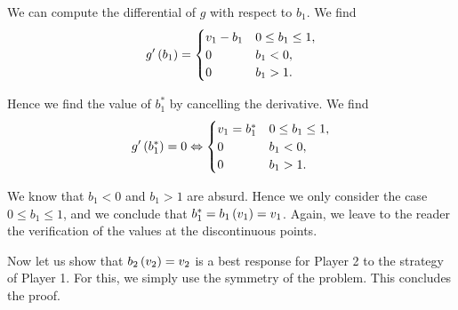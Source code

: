 We can compute the differential of $g$ with respect to $b_1$. We find
\begin{equation*}
    g' \left(b_1\right)
    =
    \begin{cases}
       v_1 - b_1  & 0 \leq b_1 \leq 1, \\
       0 & b_1 < 0, \\
       0 & b_1 > 1. \\
     \end{cases}
\end{equation*}

Hence we find the value of $b_1^{*}$ by cancelling the derivative. We find
\begin{equation*}
    g' \left(b_1^{*}\right) = 0
    \Leftrightarrow
    \begin{cases}
       v_1 = b_1^{*}  & 0 \leq b_1 \leq 1, \\
       0 & b_1 < 0, \\
       0 & b_1 > 1. \\
     \end{cases}
\end{equation*}

We know that $b_1 < 0$ and $b_1 > 1$ are absurd. Hence we only consider the case $0 \leq b_1 \leq 1$, and we conclude that $b_1^{*} = b_1 \left(v_1\right) = v_1$. Again, we leave to the reader the verification of the values at the discontinuous points.


\vspace{5mm}

Now let us show that $b_2 \left(v_2\right) = v_2$ is a best response for Player 2 to the strategy of Player 1. For this, we simply use the symmetry of the problem. This concludes the proof.
